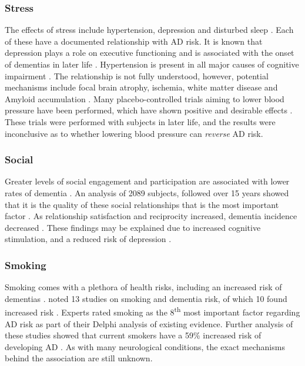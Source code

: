 \subsubsection{Stress} \label{target-stress}
The effects of stress include hypertension, depression and disturbed sleep \cite{Schneiderman2005}. Each of these have a documented relationship with AD risk. It is known that depression plays a role on executive functioning and is associated with the onset of dementias in later life \cite{Dotson2010,Royall2012,Boyle2010}. Hypertension is present in all major causes of cognitive impairment \cite{Iadecola2014}. The relationship is not fully understood, however, potential mechanisms include focal brain atrophy, ischemia, white matter disease and Amyloid accumulation \cite{Iadecola2014}. Many placebo-controlled trials aiming to lower blood pressure have been performed, which have shown positive and desirable effects \cite{Staessen2011}. These trials were performed with subjects in later life, and the results were inconclusive as to whether lowering blood pressure can \textit{reverse} AD risk.

\subsubsection{Social}
Greater levels of social engagement and participation are associated with lower rates of dementia \cite{Saczynski2006, Fratiglioni2000}. An analysis of 2089 subjects, followed over 15 years showed that it is the quality of these social relationships that is the most important factor \cite{Amieva2010}. As relationship satisfaction and reciprocity increased, dementia incidence decreased \cite{Amieva2010}. These findings may be explained due to increased cognitive stimulation, and a reduced risk of depression \cite{Saczynski2010}.

\subsubsection{Smoking}
Smoking comes with a plethora of health risks, including an increased risk of dementias \cite{cdc_smoking}. \citeauthor{Deckers2015} noted 13 studies on smoking and dementia risk, of which 10 found increased risk \cite{Deckers2015}. Experts rated smoking as the 8\textsuperscript{th} most important factor regarding AD risk as part of their Delphi analysis of existing evidence. Further analysis of these studies showed that current smokers have a 59\% increased risk of developing AD \cite{Peters2008}. As with many neurological conditions, the exact mechanisms behind the association are still unknown.

